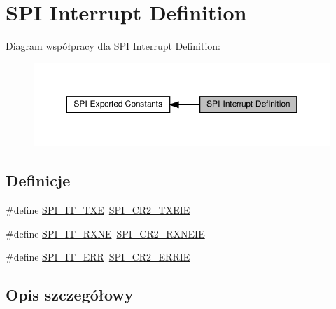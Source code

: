 \hypertarget{group___s_p_i___interrupt__definition}{}\section{S\+PI Interrupt Definition}
\label{group___s_p_i___interrupt__definition}
Diagram współpracy dla S\+PI Interrupt Definition\+:\nopagebreak
\begin{figure}[H]
\begin{center}
\leavevmode
\includegraphics[width=350pt]{group___s_p_i___interrupt__definition}
\end{center}
\end{figure}
\subsection*{Definicje}
\begin{DoxyCompactItemize}
\item 
\#define \hyperlink{group___s_p_i___interrupt__definition_ga6f0778617fc5f58086e4e29cd3781f18}{S\+P\+I\+\_\+\+I\+T\+\_\+\+T\+XE}~\hyperlink{group___peripheral___registers___bits___definition_ga23f683a1252ccaf625cae1a978989b2c}{S\+P\+I\+\_\+\+C\+R2\+\_\+\+T\+X\+E\+IE}
\item 
\#define \hyperlink{group___s_p_i___interrupt__definition_ga6c6ea3686830c60d9363f97a5d1011cc}{S\+P\+I\+\_\+\+I\+T\+\_\+\+R\+X\+NE}~\hyperlink{group___peripheral___registers___bits___definition_gaa7d4c37fbbcced7f2a0421e6ffd103ea}{S\+P\+I\+\_\+\+C\+R2\+\_\+\+R\+X\+N\+E\+IE}
\item 
\#define \hyperlink{group___s_p_i___interrupt__definition_gace6a9377da7f18ea8b5c73163c2278d6}{S\+P\+I\+\_\+\+I\+T\+\_\+\+E\+RR}~\hyperlink{group___peripheral___registers___bits___definition_gaf18705567de7ab52a62e5ef3ba27418b}{S\+P\+I\+\_\+\+C\+R2\+\_\+\+E\+R\+R\+IE}
\end{DoxyCompactItemize}


\subsection{Opis szczegółowy}


